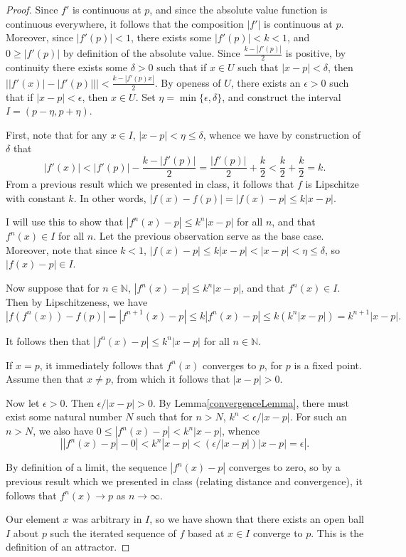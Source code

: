 \documentclass[12pt, letterpaper]{article}
\newcommand{\N}{\mathbb{N}}
\theoremstyle{definition}
\begin{document}
\begin{proof}
    Since $f'$ is continuous at $p$, and since the absolute value function is continuous everywhere, it follows that the composition $|f'|$
    is continuous at $p$. Moreover, since $|f'(p)| < 1$, there exists some $|f'(p)|<k < 1$, and $0 \ge |f'(p)|$ by definition of the absolute value.
    Since $ \frac{k - |f'(p)|}{2} $ is positive, by continuity there exists some $ \delta > 0 $ such that if $x\in U$ such that $|x - p| < \delta$,
    then $\big||f'(x)| - |f'(p)||\big| < \frac{k - |f'(p)x|}{2}$. By openess of $U$, there exists an $\epsilon > 0$ such that if $ |x-p| < \epsilon $, then $x\in U$. 
    Set $\eta = \min\{\epsilon, \delta\}$, and construct the interval $ I = (p - \eta, p + \eta)$.

    First, note that for any $x\in I$, $|x - p| < \eta \le \delta$, whence we have by construction of $\delta$ that
    \[
        |f'(x)| < |f'(p)| - \frac{k - |f'(p)|}{2} = \frac{|f'(p)|}{2} + \frac{k}{2} < \frac{k}{2} + \frac{k}{2} = k.
        \]
    From a previous result which we presented in class, it follows that $f$ is Lipschitze with constant $k$. In other words, 
    $ |f(x) - f(p)| = |f(x) - p| \le k|x-p|$. 
    
    I will use this to show that $ |f^n(x) - p| \le k^n|x-p| $ for all $n$, and that $ f^n(x)\in I $ for all $n$. Let the previous observation
    serve as the base case. Moreover, note that since $k < 1$, $|f(x) - p| \le k|x - p| < |x - p| < \eta \le \delta$, so $ |f(x) - p|\in I $.

    Now suppose that for $n\in \N$, $ |f^n(x) - p|\le k^n|x - p|$, and that $f^n(x)\in I$. Then by Lipschitzeness, we have 
    \[
        |f(f^n(x))- f(p)| = |f^{n+1}(x) - p| \le k|f^n(x) - p| \le k(k^n|x-p|) = k^{n +1}|x-p|.
    \]

    It follows then that $|f^n(x) - p|\le k^n|x - p|$ for all $n\in \N$. 

    If $x = p$, it immediately follows that $f^n(x)$ converges to $p$, for $p$ is a fixed point. Assume then that $x \ne p$, from which it follows that 
    $|x - p| > 0$.

    Now let $\epsilon > 0$. Then $\epsilon/|x-p| > 0$. By Lemma\ref{convergenceLemma}, there must exist some natural number $ N $ such that for 
    $ n> N $, $ k^n < \epsilon/|x - p| $. For such an $n > N$, we also have $ 0 \le |f^n(x) - p| < k^n |x - p|$, whence 
    \[ 
        \left|  |f^n(x) - p|-0| < k^n |x - p| < (\epsilon / |x- p|)|x - p| = \epsilon  \right|.
         \]

    By definition of a limit, the sequence $ |f^n(x) - p| $ converges to zero, so by a previous result which we presented in class (relating distance and convergence), 
    it follows that $ f^n(x) \to p $ as $n \to \infty$.

    Our element $x$ was arbitrary in $I$, so we have shown that there exists an open ball $I$ about $p$ such the iterated sequence of $f$ based at $x\in I$ converge to $p$.
    This is the definition of an attractor. 
    
\end{proof}
\end{document}

